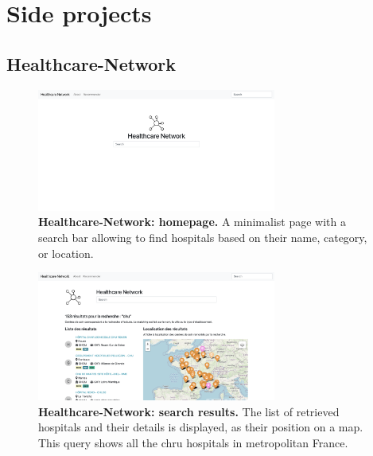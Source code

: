 \chapter{Side projects}

\section{Healthcare-Network}

\begin{figure}[H]
    \includegraphics[width=0.7\textwidth]{images/healthcare-network/home.png}
    \centering
    \caption{
        \textbf{Healthcare-Network: homepage.} A minimalist page with a search bar allowing to find hospitals based on their name, category, or location.
    }
    \label{fig:hn-home}
\end{figure}


\begin{figure}[H]
    \includegraphics[width=0.7\textwidth]{images/healthcare-network/search.png}
    \centering
    \caption{
        \textbf{Healthcare-Network: search results.} The list of retrieved hospitals and their details is displayed, as their position on a map. This query shows all the \ac{chru} hospitals in metropolitan France.
    }
    \label{fig:hn-search}
\end{figure}


